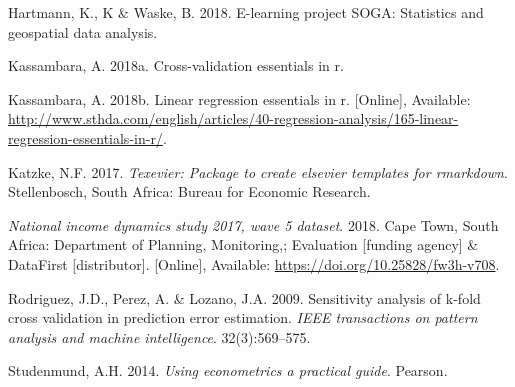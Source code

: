 \documentclass[11pt,preprint, authoryear]{elsarticle}
\numberwithin{equation}{section}
\numberwithin{figure}{section}
\numberwithin{table}{section}
\newlength{\cslhangindent}
\newenvironment{CSLReferences}%
  {\setlength{\parindent}{0pt}%
  \everypar{\setlength{\hangindent}{\cslhangindent}}\ignorespaces}%
  {\par}
\begin{document}
\hypertarget{refs}{}
\begin{CSLReferences}{1}{0}
\leavevmode\hypertarget{ref-ridge}{}%
Hartmann, K., K \& Waske, B. 2018. E-learning project SOGA: Statistics
and geospatial data analysis.

\leavevmode\hypertarget{ref-k}{}%
Kassambara, A. 2018a. Cross-validation essentials in r.

\leavevmode\hypertarget{ref-rmse}{}%
Kassambara, A. 2018b. Linear regression essentials in r. {[}Online{]},
Available:
\url{http://www.sthda.com/english/articles/40-regression-analysis/165-linear-regression-essentials-in-r/}.

\leavevmode\hypertarget{ref-Texevier}{}%
Katzke, N.F. 2017. \emph{{Texevier}: {P}ackage to create elsevier
templates for rmarkdown}. Stellenbosch, South Africa: Bureau for
Economic Research.

\leavevmode\hypertarget{ref-nids}{}%
\emph{National income dynamics study 2017, wave 5 dataset}. 2018. Cape
Town, South Africa: Department of Planning, Monitoring,; Evaluation
{[}funding agency{]} \& DataFirst {[}distributor{]}. {[}Online{]},
Available: \url{https://doi.org/10.25828/fw3h-v708}.

\leavevmode\hypertarget{ref-kfold}{}%
Rodriguez, J.D., Perez, A. \& Lozano, J.A. 2009. Sensitivity analysis of
k-fold cross validation in prediction error estimation. \emph{IEEE
transactions on pattern analysis and machine intelligence}.
32(3):569--575.

\leavevmode\hypertarget{ref-econ}{}%
Studenmund, A.H. 2014. \emph{Using econometrics a practical guide}.
Pearson.

\end{CSLReferences}


\end{document}

